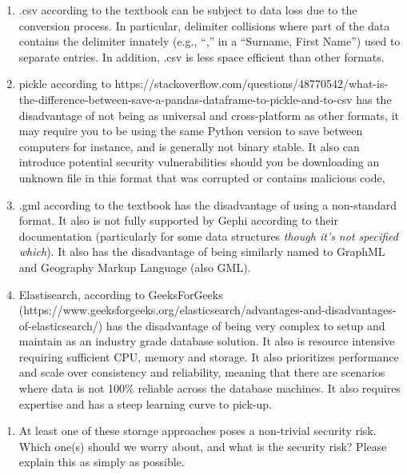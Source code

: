 \documentclass[11pt]{article}
\providecommand{\tightlist}{%
      \setlength{\itemsep}{0pt}\setlength{\parskip}{0pt}}
\begin{document}
\begin{enumerate}
\def\labelenumi{\arabic{enumi}.}
\tightlist
\item
  .csv according to the textbook can be subject to data loss due to the
  conversion process. In particular, delimiter collisions where part of
  the data contains the delimiter innately (e.g., ``,'' in a ``Surname,
  First Name'') used to separate entries. In addition, .csv is less
  space efficient than other formats.
\item
  pickle according to
  https://stackoverflow.com/questions/48770542/what-is-the-difference-between-save-a-pandas-dataframe-to-pickle-and-to-csv
  has the disadvantage of not being as universal and cross-platform as
  other formats, it may require you to be using the same Python version
  to save between computers for instance, and is generally not binary
  stable. It also can introduce potential security vulnerabilities
  should you be downloading an unknown file in this format that was
  corrupted or contains malicious code,
\item
  .gml according to the textbook has the disadvantage of using a
  non-standard format. It also is not fully supported by Gephi according
  to their documentation (particularly for some data structures
  \emph{though it's not specified which}). It also has the disadvantage
  of being similarly named to GraphML and Geography Markup Language
  (also GML).
\item
  Elastisearch, according to GeeksForGeeks
  (https://www.geeksforgeeks.org/elasticsearch/advantages-and-disadvantages-of-elasticsearch/)
  has the disadvantage of being very complex to setup and maintain as an
  industry grade database solution. It also is resource intensive
  requiring sufficient CPU, memory and storage. It also prioritizes
  performance and scale over consistency and reliability, meaning that
  there are scenarios where data is not 100\% reliable across the
  database machines. It also requires expertise and has a steep learning
  curve to pick-up.
\end{enumerate}

    \begin{enumerate}
\def\labelenumi{(\alph{enumi})}
\setcounter{enumi}{2}
\tightlist
\item
  At least one of these storage approaches poses a non-trivial security
  risk. Which one(s) should we worry about, and what is the security
  risk? Please explain this as simply as possible.
\end{enumerate}
\end{document}
